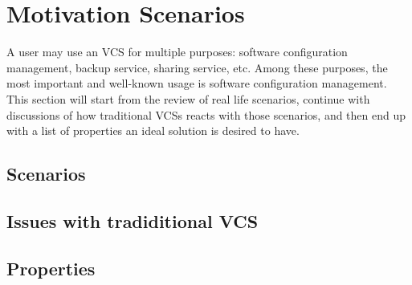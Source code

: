 \section{Motivation Scenarios}
\label{s:motivation}

A user may use an VCS for multiple purposes: software configuration management,
backup service, sharing service, etc. Among these purposes, the most important and well-known usage is
software configuration management. This section will start from the review of
 real life scenarios, continue with discussions of how traditional
VCSs reacts with those scenarios, and then end up with a
list of properties an ideal solution is desired to have.

\subsection{Scenarios}


\subsection{Issues with tradiditional VCS}


\subsection{Properties}



